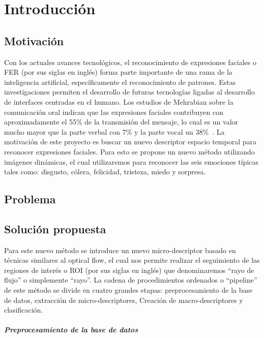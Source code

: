 \chapter[Introducción]{Introducción}
\label{ch:intro}

\section{Motivación}
\label{sec:motivacion}
Con los actuales avances tecnológicos, el reconocimiento de expresiones faciales o FER (por sus siglas en inglés) forma parte importante de una rama de la inteligencia artificial, específicamente el reconocimiento de patrones.  Estas investigaciones permiten el desarrollo de futuras tecnologías ligadas al desarrollo de interfaces centradas en el humano. 
Los estudios de Mehrabian sobre la comunicación oral indican que las expresiones faciales contribuyen con aproximadamente el 55\% de la transmisión del mensaje, lo cual es un valor mucho mayor que la parte verbal con 7\% y la parte vocal un 38\%~\cite{MEHRABIANA}.
La motivación de este proyecto es buscar un nuevo descriptor espacio temporal para reconocer expresiones faciales. Para esto se propone un nuevo método utilizando imágenes dinámicas, el cual utilizaremos para reconocer las seis emociones típicas tales como: disgusto, cólera, felicidad, tristeza, miedo y sorpresa.

\section{Problema}
\label{sec:problema}



\section{Solución propuesta}
\label{sec:solucion}

Para este nuevo método se introduce un nuevo micro-descriptor basado en técnicas similares al optical flow, el cual nos permite realizar el seguimiento de las regiones de interés o ROI (por sus siglas en inglés) que denominaremos ``rayo de flujo'' o simplemente ``rayo''.
La cadena de procedimientos ordenados o ``pipeline'' de este método se divide en cuatro grandes
etapas: preprocesamiento de la base de datos, extracción de micro-descriptores, Creación de macro-descriptores y clasificación.

\paragraph{Preprocesamiento de la base de datos}
\label{ch1:par:preprocesamientobdd}



